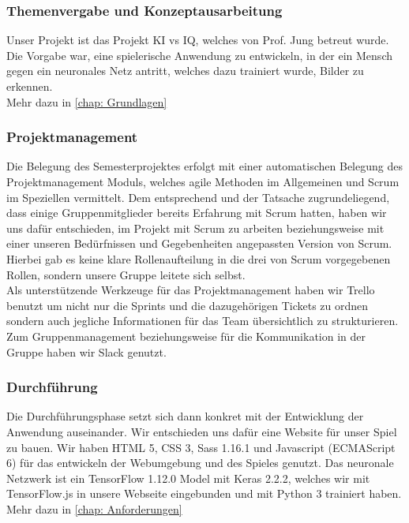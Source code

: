 \documentclass[11pt]{article}
\begin{document}
\subsubsection{ Themenvergabe und Konzeptausarbeitung }
\label{chap: Themenvergabe}

Unser Projekt ist das Projekt KI vs IQ, welches von Prof. Jung betreut wurde.
Die Vorgabe war, eine spielerische Anwendung zu entwickeln, in der ein Mensch gegen ein neuronales Netz antritt, welches dazu trainiert wurde, Bilder zu erkennen.\\
Mehr dazu in \autoref{chap: Grundlagen}
	
\subsubsection{  Projektmanagement }
\label{chap: Projektmanagement}
Die Belegung des Semesterprojektes erfolgt mit einer automatischen Belegung des Projektmanagement Moduls, welches agile Methoden im Allgemeinen und Scrum im Speziellen vermittelt. Dem entsprechend und der Tatsache zugrundeliegend, dass einige Gruppenmitglieder bereits Erfahrung mit Scrum hatten, haben wir uns dafür entschieden, im Projekt mit Scrum zu arbeiten beziehungsweise mit einer unseren Bedürfnissen und Gegebenheiten angepassten Version von Scrum.
Hierbei gab es keine klare Rollenaufteilung in die drei von Scrum vorgegebenen Rollen, sondern unsere Gruppe leitete sich selbst.\\
Als unterstützende Werkzeuge für das Projektmanagement haben wir Trello benutzt um nicht nur die Sprints und die dazugehörigen Tickets zu ordnen sondern auch jegliche Informationen für das Team übersichtlich zu strukturieren. Zum Gruppenmanagement beziehungsweise für die Kommunikation in der Gruppe haben wir Slack genutzt.

\subsubsection{ Durchführung }
\label{chap: durchfuhrung}
Die Durchführungsphase setzt sich dann konkret mit der Entwicklung der Anwendung auseinander. Wir entschieden uns dafür eine Website für unser Spiel zu bauen. Wir haben HTML 5, CSS 3, Sass 1.16.1 und Javascript (ECMAScript 6) für das entwickeln der Webumgebung und des Spieles genutzt. Das neuronale Netzwerk ist ein TensorFlow 1.12.0 Model mit Keras 2.2.2, welches wir mit TensorFlow.js in unsere Webseite eingebunden und mit Python 3 trainiert haben.\\
Mehr dazu in \autoref{chap: Anforderungen}
\end{document}
